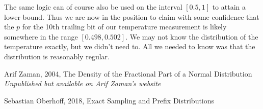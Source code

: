 \documentclass{article}
\theoremstyle{theorem}
\theoremstyle{definition}
\begin{document}
The same logic can of course also be used on the interval $[0.5,1]$ to attain a lower bound. Thus we are now in the position to claim with some confidence that the $p$ for the 10th trailing bit of our temperature measurement is likely somewhere in the range $[0.498,0.502]$. We may not know the distribution of the temperature exactly, but we didn't need to. All we needed to know was that the distribution is reasonably regular.

\begin{thebibliography}{1}
Arif Zaman, 2004, The Density of the Fractional Part of a Normal Distribution \textit{Unpublished but available on Arif Zaman's website}
	
Sebastian Oberhoff, 2018, Exact Sampling and Prefix Distributions
\end{thebibliography}

\vfill\eject
\end{document}
